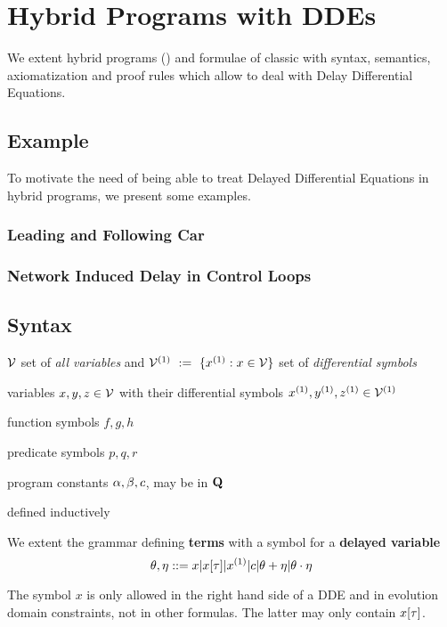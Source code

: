 \chapter{Hybrid Programs with DDEs}\label{hybrid-programs-with-ddes}

We extent hybrid programs (\HPs) and formulae of classic \dL with syntax, semantics, axiomatization and proof rules which allow to deal with Delay Differential Equations.

\section{Example}
    \label{example-hp-cars}
    To motivate the need of being able to treat Delayed Differential Equations in hybrid programs, we present some examples.

    \subsection{Leading and Following Car}

    \subsection{Network Induced Delay in Control Loops}

\section{Syntax}
    \label{sec:syntax}

    $\mathcal{V}$ set of \textit{all variables} and $\D{\allvars}\defeq\{\D{x}:x\in\allvars\}$ set of \textit{differential symbols}

    variables $x,y,z\in\mathcal{V}$ with their differential symbols $\D{x},\D{y},\D{z}\in\D{\allvars}$

    function symbols $f,g,h$

    predicate symbols $p,q,r$

    program constants $\alpha, \beta, c$, may be in $\mathbf{Q}$

    defined inductively

    \begin{definition}[Terms]
        \label{def:syntax-terms}

        We extent the grammar defining \textbf{terms} with a symbol for a \textbf{delayed variable}
        \begin{equation}
            \theta,\eta ::= x|\xtau|\D{x}|c|\theta+\eta|\theta\cdot\eta
        \end{equation}

        The symbol $x$ is only allowed in the right hand side of a DDE and in evolution domain constraints, not in other formulas. The latter may only contain $x[\tau]$.

    \end{definition}

